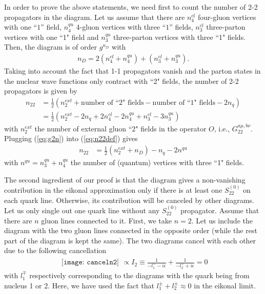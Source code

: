 \documentclass[onecolumn,showpacs,nobibnotes,nofootinbib,12pt,aps,prd,showpacs,notitlepage,nofootinbib,preprintnumbers,amsmath,amssymb]{article}
\begin{document}
In order to prove the above statements, we need first to count the
number of 2-2 propagators in the diagram. Let us assume that there are
$n_{4}^{cl}$ four-gluon vertices with one ``$1$'' field, $n_{4}^{qu}$
4-gluon vertices with three ``$1$'' fields, $n_{3}^{cl}$ three-parton
vertices with one ``1" field and $n_{3}^{qu}$ three-parton vertices
with three ``1" fields. Then, the diagram is of order $g^{n_D}$ with
\begin{align}
  n_D=2(n_{4}^{cl}+ n_{4}^{qu})+(n_{3}^{cl}+n_{3}^{qu}).
  \label{eq:g2n}
\end{align}
Taking into account the fact that 1-1 propagators vanish and the
parton states in the nuclear wave functions only contract with ``2"
fields, the number of 2-2 propagators is given by
\begin{align}\label{eq:n22def}
  n_{22}&=\frac{1}{2}(n_{2}^{ext}+\text{number of ``2" fields}
  -\text{number of ``1" fields}-2n_q) \nonumber\\
  &=\frac{1}{2}( n_{2}^{ext}-2 n_q + 2 n_{4}^{cl} - 2
  n_{4}^{qu}+n_{3}^{cl}-3n_{3}^{qu})
\end{align}
with $n_{2}^{ext}$ the number of external gluon ``2" fields in the
operator $O$, i.e., $G_{22}^{a\mu,b\nu}$. Plugging (\ref{eq:g2n}) into
(\ref{eq:n22def}) gives
\begin{align}\label{eq:pc}
  n_{22}&=\frac{1}{2}(n_{2}^{ext} + n_D)-n_q-2n^{qu}
\end{align}
with $n^{qu}=n_3^{qu}+n_4^{qu}$ the number of (quantum) vertices with
three ``1" fields.

The second ingredient of our proof is that the diagram gives a
non-vanishing contribution in the eikonal approximation only if there
is at least one $S^{(0)}_{22}$ on each quark line. Otherwise, its
contribution will be canceled by other diagrams. Let us only single
out one quark line without any $S^{(0)}_{22}$ propagator. Assume that
there are $n$ gluon lines connected to it. First, we take $n=2$. Let
us include the diagram with the two gluon lines connected in the
opposite order (while the rest part of the diagram is kept the
same). The two diagrams cancel with each other due to the following
cancellation
\begin{align}
\begin{array}{l}
\texttt{[image: canceln2]}
\end{array}
\propto I_2\equiv \frac{1}{-l_1^\mp-i\epsilon}+\frac{1}{-l_2^\mp+i\epsilon}=0
\end{align}
with $l_1^\mp$ respectively corresponding to the diagrams with the
quark being from nucleus 1 or 2. Here, we have used the fact that
$l_1^\pm+l_2^\pm\approx 0$ in the eikonal limit.
\end{document}
